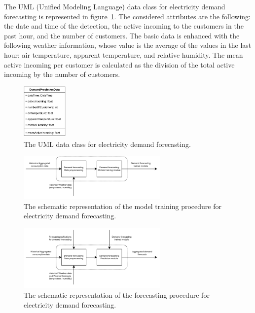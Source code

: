 The UML (Unified Modeling Language) data class for electricity demand forecasting is represented in figure~\ref{fig:umldemand}.
The considered attributes are the following: the date and time of the detection, the active incoming to the customers in the past hour, and the number of customers.
The basic data is enhanced with the following weather information, whose value is the average of the values in the last hour: air temperature, apparent temperature, and relative humidity.
The mean active incoming per customer is calculated as the division of the total active incoming by the number of customers.

\begin{figure}[H]
\centering
\includegraphics[width=0.20\textwidth]{images/demand_prediction_uml}
\caption{The UML data class for electricity demand forecasting.}
\label{fig:umldemand}
\end{figure}

\begin{figure}[H]
\centering
\includegraphics[width=0.65\textwidth]{images/system_model_training_demand}
\caption{The schematic representation of the model training procedure for electricity demand forecasting.}
\label{fig:modeltrainingdemand}
\end{figure}

\begin{figure}[H]
\centering
\includegraphics[width=0.65\textwidth]{images/system_model_forecasting_demand}
\caption{The schematic representation of the forecasting procedure for electricity demand forecasting.}
\label{fig:modelforecastingdemand}
\end{figure}

